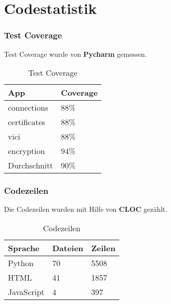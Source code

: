 \section{Codestatistik}
\subsubsection{Test Coverage}
Test Coverage wurde von \textbf{Pycharm} gemessen. \\

\begin{table}[H]
\centering
    \begin{tabular}{|p{6cm}|p{6cm}|}
    \hline    
    \rowcolor{lightblue}
	App & Coverage \\ \hline
	connections & 88\% \\ \hline    
	certificates & 88\% \\ \hline   
	vici & 88\% \\ \hline  
	encryption & 94\% \\ \hline  
	\rowcolor{lightblue}
	Durchschnitt &   90\% \\ \hline
    \end{tabular}
    \caption[Test Coverage]{Test Coverage}
\end{table}

\subsubsection{Codezeilen}
Die Codezeilen wurden mit Hilfe von \textbf{CLOC} \cite{CLOC} gezählt. \\

\begin{table}[H]
\centering
    \begin{tabular}{|p{3cm} |p{3cm} |p{3cm} |}
    \hline    
    \rowcolor{lightblue}
	Sprache & Dateien & Zeilen  \\ \hline   
	Python & 70 & 5508 \\ \hline
	HTML & 41 & 1857 \\ \hline
	JavaScript & 4 & 397 \\ \hline
    \end{tabular}
    \caption[Codezeilen]{Codezeilen}
\end{table}

